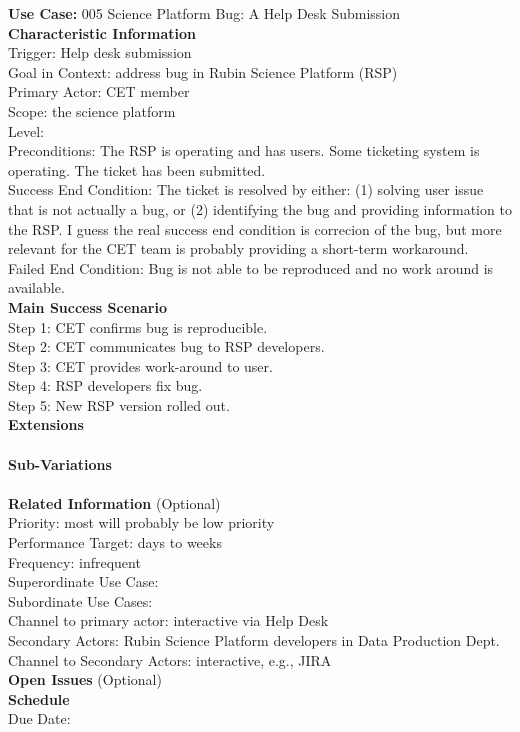 {\bf Use Case:} 005 Science Platform Bug: A Help Desk Submission  \\

{\bf Characteristic Information} \\
Trigger: Help desk submission \\
Goal in Context: address bug in Rubin Science Platform (RSP)\\
Primary Actor: CET member \\
Scope: the science platform \\
Level: \\
Preconditions: The RSP is operating and has users.  Some ticketing system is operating.  The ticket has been submitted. \\
Success End Condition: The ticket is resolved by either: (1) solving user issue that is not actually a bug, or (2) identifying the bug and providing information to the RSP.  I guess the real success end condition is correcion of the bug, but more relevant for the CET team is probably providing a short-term workaround. \\
Failed End Condition: Bug is not able to be reproduced and no work around is available. \\

{\bf Main Success Scenario} \\
Step 1: CET confirms bug is reproducible. \\
Step 2: CET communicates bug to RSP developers. \\
Step 3: CET provides work-around to user. \\
Step 4: RSP developers fix bug. \\
Step 5: New RSP version rolled out. \\

{\bf Extensions} \\
\\

{\bf Sub-Variations} \\
\\

{\bf Related Information} (Optional) \\
Priority: most will probably be low priority \\
Performance Target: days to weeks \\
Frequency: infrequent \\
Superordinate Use Case:  \\
Subordinate Use Cases: \\
Channel to primary actor: interactive via Help Desk \\
Secondary Actors: Rubin Science Platform developers in Data Production Dept. \\
Channel to Secondary Actors: interactive, e.g., JIRA \\

{\bf Open Issues} (Optional) \\

{\bf Schedule} \\
Due Date: \\
